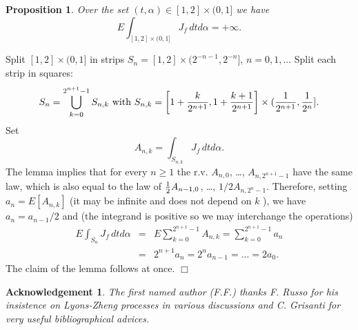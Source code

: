 \documentclass{article}
\newtheorem{acknowledgement}[theorem]{Acknowledgement}
\newtheorem{proposition}[theorem]{Proposition}
\newenvironment{proof}[1][Proof]{{\sc #1.} }{\hfill $\Box$}
\begin{document}
\begin{proposition}
Over the set $(t,\alpha )\in \left[ 1,2\right] \times (0,1]$ we have 
\begin{equation*}
E\int_{\left[ 1,2\right] \times (0,1]}J_{f}\,dtd\alpha =+\infty .
\end{equation*}
\end{proposition}

\begin{proof}
Split $\left[ 1,2\right] \times (0,1]$ in strips $S_{n}=\left[ 1,2\right]
\times (2^{-n-1},2^{-n}]$, $n=0,1,$... Split each strip in
squares: 
\begin{equation*}
S_{n}=\bigcup_{k=0}^{2^{n+1}-1}S_{n,k}\text{ with }S_{n,k}=\left[ 1+\frac{k}{%
2^{n+1}},1+\frac{k+1}{2^{n+1}}\right] \times (\frac{1}{2^{n+1}},\frac{1}{%
2^{n}}].
\end{equation*}
Set 
\begin{equation*}
A_{n,k}=\int_{S_{n,k}}J_{f}\,dtd\alpha .
\end{equation*}
The lemma implies that for every $n\geq 1$ the r.v. $A_{n,0}$, \dots , $%
A_{n,2^{n+1}-1}$ have the same law, which is also equal to the law of $\frac{%
1}{2}A_{n-1,0}$, \dots , $1/2A_{n,2^{n}-1}$. Therefore, setting $%
a_{n}=E\left[ A_{n,k}\right] $ (it may be infinite and does not depend on $k$%
), we have $a_{n}=a_{n-1}/2$ and (the integrand is positive so we
may interchange the operations) 
\begin{eqnarray*}
E\int_{S_{n}}J_{f}\,dtd\alpha
&=&E\sum_{k=0}^{2^{n+1}-1}A_{n,k}=\sum_{k=0}^{2^{n+1}-1}a_{n} \\
&=&2^{n+1}a_{n}=2^{n}a_{n-1}=...=2a_{0}\text{.}
\end{eqnarray*}
The claim of the lemma follows at once.
\end{proof}

\begin{acknowledgement}
The first named author (F.F.) thanks F. Russo for his insistence on
Lyons-Zheng processes in various discussions and 
C. Grisanti for very useful bibliographical advices.
\end{acknowledgement}
\end{document}

